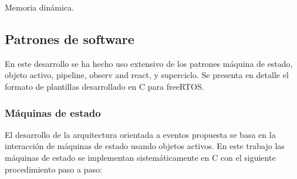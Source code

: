 Memoria dinámica.


\subsection{Patrones de software}
En este desarrollo se ha hecho uso extensivo de los patrones máquina de estado, objeto activo, pipeline, observ and react, y superciclo. Se presenta en detalle el formato de plantillas desarrollado en C para freeRTOS.\\

\subsubsection{Máquinas de estado}
El desarrollo de la arquitectura orientada a eventos propuesta se basa en la interacción de máquinas de estado usando objetos activos. En este trabajo las máquinas de estado se implementan sistemáticamente en C con el siguiente procedimiento paso a paso:

